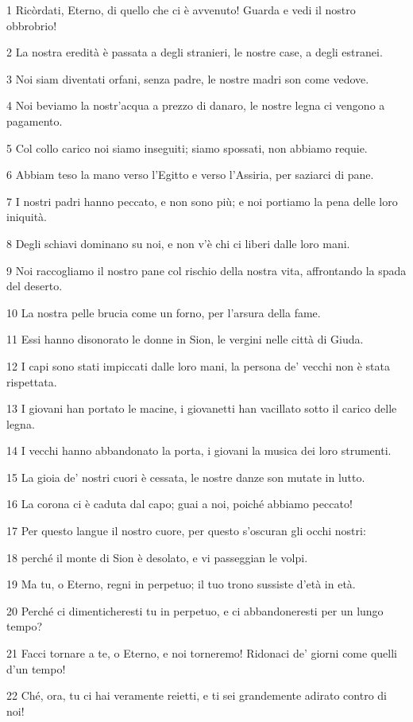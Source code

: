 \par 1 Ricòrdati, Eterno, di quello che ci è avvenuto! Guarda e vedi il nostro obbrobrio!
\par 2 La nostra eredità è passata a degli stranieri, le nostre case, a degli estranei.
\par 3 Noi siam diventati orfani, senza padre, le nostre madri son come vedove.
\par 4 Noi beviamo la nostr'acqua a prezzo di danaro, le nostre legna ci vengono a pagamento.
\par 5 Col collo carico noi siamo inseguiti; siamo spossati, non abbiamo requie.
\par 6 Abbiam teso la mano verso l'Egitto e verso l'Assiria, per saziarci di pane.
\par 7 I nostri padri hanno peccato, e non sono più; e noi portiamo la pena delle loro iniquità.
\par 8 Degli schiavi dominano su noi, e non v'è chi ci liberi dalle loro mani.
\par 9 Noi raccogliamo il nostro pane col rischio della nostra vita, affrontando la spada del deserto.
\par 10 La nostra pelle brucia come un forno, per l'arsura della fame.
\par 11 Essi hanno disonorato le donne in Sion, le vergini nelle città di Giuda.
\par 12 I capi sono stati impiccati dalle loro mani, la persona de' vecchi non è stata rispettata.
\par 13 I giovani han portato le macine, i giovanetti han vacillato sotto il carico delle legna.
\par 14 I vecchi hanno abbandonato la porta, i giovani la musica dei loro strumenti.
\par 15 La gioia de' nostri cuori è cessata, le nostre danze son mutate in lutto.
\par 16 La corona ci è caduta dal capo; guai a noi, poiché abbiamo peccato!
\par 17 Per questo langue il nostro cuore, per questo s'oscuran gli occhi nostri:
\par 18 perché il monte di Sion è desolato, e vi passeggian le volpi.
\par 19 Ma tu, o Eterno, regni in perpetuo; il tuo trono sussiste d'età in età.
\par 20 Perché ci dimenticheresti tu in perpetuo, e ci abbandoneresti per un lungo tempo?
\par 21 Facci tornare a te, o Eterno, e noi torneremo! Ridonaci de' giorni come quelli d'un tempo!
\par 22 Ché, ora, tu ci hai veramente reietti, e ti sei grandemente adirato contro di noi!


